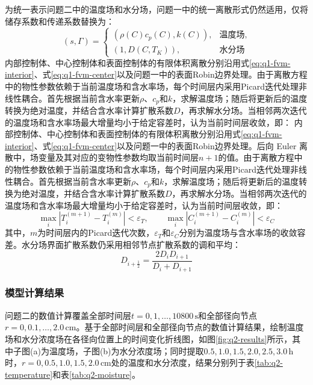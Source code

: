 \documentclass[withoutpreface,bwprint]{cumcmthesis}
\begin{document}
为统一表示问题二中的温度场和水分场，问题一中的统一离散形式仍然适用，仅将储存系数和传递系数替换为：
\begin{equation}
(s,\Gamma)=
\begin{cases}
(\rho(C)c_p(C),k(C)),&\text{温度场},\\
(1,D(C,T_K)),&\text{水分场}
\end{cases}
\label{eq:q2-variable-parameters}
\end{equation}
内部控制体、中心控制体和表面控制体的有限体积离散分别沿用式\eqref{eq:q1-fvm-interior}、式\eqref{eq:q1-fvm-center}以及问题一中的表面Robin边界处理。由于离散方程中的物性参数依赖于当前温度场和含水率场，每个时间层内采用Picard迭代处理非线性耦合。首先根据当前含水率更新$\rho$、$c_p$和$k$，求解温度场；随后将更新后的温度转换为绝对温度，并结合含水率计算扩散系数$D$，再求解水分场。当相邻两次迭代的温度场和含水率场最大增量均小于给定容差时，认为当前时间层收敛，即：
内部控制体、中心控制体和表面控制体的有限体积离散分别沿用式\eqref{eq:q1-fvm-interior}、式\eqref{eq:q1-fvm-center}以及问题一中的表面Robin边界处理。后向 Euler 离散中，场变量及其对应的变物性参数均取当前时间层$n+1$的值。由于离散方程中的物性参数依赖于当前温度场和含水率场，每个时间层内采用Picard迭代处理非线性耦合。首先根据当前含水率更新$\rho$、$c_p$和$k$，求解温度场；随后将更新后的温度转换为绝对温度，并结合含水率计算扩散系数$D$，再求解水分场。当相邻两次迭代的温度场和含水率场最大增量均小于给定容差时，认为当前时间层收敛，即：
\begin{equation}
\max_i\left|T_i^{(m+1)}-T_i^{(m)}\right|<\varepsilon_T,
\qquad
\max_i\left|C_i^{(m+1)}-C_i^{(m)}\right|<\varepsilon_C
\label{eq:q2-picard}
\end{equation}
其中，$m$为时间层内的Picard迭代次数，$\varepsilon_T$和$\varepsilon_C$分别为温度场与含水率场的收敛容差。水分场界面扩散系数仍采用相邻节点扩散系数的调和平均：
\begin{equation}
D_{i+\frac12}
=
\frac{2D_iD_{i+1}}{D_i+D_{i+1}}
\label{eq:q2-harmonic-diffusivity}
\end{equation}

\subsubsection{模型计算结果}

问题二的数值计算覆盖全部时间层$t=0,1,\ldots,10800\,\mathrm{s}$和全部径向节点$r=0,0.1,\ldots,2.0\,\mathrm{cm}$。基于全部时间层和全部径向节点的数值计算结果，绘制温度场和水分浓度场在各径向位置上的时间变化折线图，如图\ref{fig:q2-results}所示，其中子图(a)为温度场，子图(b)为水分浓度场；同时提取$0.5,1.0,1.5,2.0,2.5,3.0\,\mathrm{h}$时，$r=0,0.5,1.0,1.5,2.0\,\mathrm{cm}$处的温度和水分浓度，结果分别列于表\ref{tab:q2-temperature}和表\ref{tab:q2-moisture}。
\end{document}
